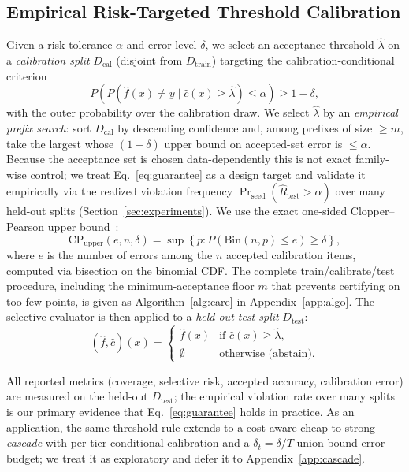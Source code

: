 \subsection{Empirical Risk-Targeted Threshold Calibration}
\label{sec:method:risk}

Given a risk tolerance $\alpha$ and error level $\delta$, we select an acceptance threshold $\hat{\lambda}$ on a \emph{calibration split} $D_{\text{cal}}$ (disjoint from $D_{\text{train}}$) targeting the calibration-conditional criterion
\begin{equation}
    P\!\left(P\!\left(\hat{f}(x) \neq y \mid \hat{c}(x) \geq \hat{\lambda}\right) \leq \alpha\right) \geq 1 - \delta,
    \label{eq:guarantee}
\end{equation}
with the outer probability over the calibration draw. We select $\hat{\lambda}$ by an \emph{empirical prefix search}: sort $D_{\text{cal}}$ by descending confidence and, among prefixes of size $\geq m$, take the largest whose $(1{-}\delta)$ upper bound on accepted-set error is $\leq\alpha$. Because the acceptance set is chosen data-dependently this is not exact family-wise control; we treat Eq.~\eqref{eq:guarantee} as a design target and validate it empirically via the realized violation frequency $\Pr_{\text{seed}}(\hat R_{\text{test}}>\alpha)$ over many held-out splits (Section~\ref{sec:experiments}). We use the exact one-sided Clopper--Pearson upper bound~\citep{clopper1934use}:
\begin{equation}
    \text{CP}_{\text{upper}}(e, n, \delta) = \sup\!\left\{p : P\!\left(\text{Bin}(n, p) \leq e\right) \geq \delta\right\},
    \label{eq:cp}
\end{equation}
where $e$ is the number of errors among the $n$ accepted calibration items, computed via bisection on the binomial CDF. The complete train/calibrate/test procedure, including the minimum-acceptance floor $m$ that prevents certifying on too few points, is given as Algorithm~\ref{alg:care} in Appendix~\ref{app:algo}. The selective evaluator is then applied to a \emph{held-out test split} $D_{\text{test}}$:
\begin{equation}
    (\hat{f}, \hat{c})(x) = \begin{cases} \hat{f}(x) & \text{if } \hat{c}(x) \geq \hat{\lambda}, \\ \emptyset & \text{otherwise (abstain).} \end{cases}
    \label{eq:selective}
\end{equation}

All reported metrics (coverage, selective risk, accepted accuracy, calibration error) are measured on the held-out $D_{\text{test}}$; the empirical violation rate over many splits is our primary evidence that Eq.~\eqref{eq:guarantee} holds in practice. As an application, the same threshold rule extends to a cost-aware cheap-to-strong \emph{cascade} with per-tier conditional calibration and a $\delta_t{=}\delta/T$ union-bound error budget; we treat it as exploratory and defer it to Appendix~\ref{app:cascade}.
